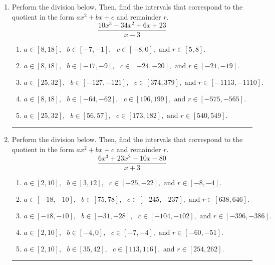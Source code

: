 \documentclass[14pt]{extbook}
\newcommand{\litem}[1]{\item#1\hspace*{-1cm}\rule{\textwidth}{0.4pt}}
\begin{document}
\begin{enumerate}
{\begin{enumerate}[label=\Alph*.]
\end{enumerate} }
\litem{
Perform the division below. Then, find the intervals that correspond to the quotient in the form $ax^2+bx+c$ and remainder $r$.\[ \frac{10x^{3} -34 x^{2} +6 x + 23}{x -3} \]\begin{enumerate}[label=\Alph*.]
\item \( a \in [8, 18], \text{   } b \in [-7, -1], \text{   } c \in [-8, 0], \text{   and   } r \in [5, 8]. \)
\item \( a \in [8, 18], \text{   } b \in [-17, -9], \text{   } c \in [-24, -20], \text{   and   } r \in [-21, -19]. \)
\item \( a \in [25, 32], \text{   } b \in [-127, -121], \text{   } c \in [374, 379], \text{   and   } r \in [-1113, -1110]. \)
\item \( a \in [8, 18], \text{   } b \in [-64, -62], \text{   } c \in [196, 199], \text{   and   } r \in [-575, -565]. \)
\item \( a \in [25, 32], \text{   } b \in [56, 57], \text{   } c \in [173, 182], \text{   and   } r \in [540, 549]. \)

\end{enumerate} }
\litem{
Perform the division below. Then, find the intervals that correspond to the quotient in the form $ax^2+bx+c$ and remainder $r$.\[ \frac{6x^{3} +23 x^{2} -10 x -80}{x + 3} \]\begin{enumerate}[label=\Alph*.]
\item \( a \in [2, 10], \text{   } b \in [3, 12], \text{   } c \in [-25, -22], \text{   and   } r \in [-8, -4]. \)
\item \( a \in [-18, -10], \text{   } b \in [75, 78], \text{   } c \in [-245, -237], \text{   and   } r \in [638, 646]. \)
\item \( a \in [-18, -10], \text{   } b \in [-31, -28], \text{   } c \in [-104, -102], \text{   and   } r \in [-396, -386]. \)
\item \( a \in [2, 10], \text{   } b \in [-4, 0], \text{   } c \in [-7, -4], \text{   and   } r \in [-60, -51]. \)
\item \( a \in [2, 10], \text{   } b \in [35, 42], \text{   } c \in [113, 116], \text{   and   } r \in [254, 262]. \)


\end{enumerate}}
\end{enumerate}
\end{document}
